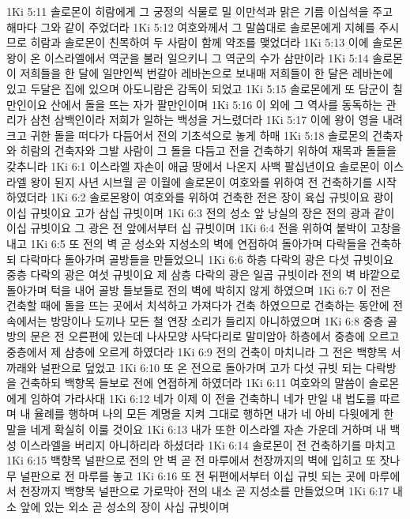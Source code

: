 1Ki 5:11  솔로몬이 히람에게 그 궁정의 식물로 밀 이만석과 맑은 기름 이십석을 주고 해마다 그와 같이 주었더라
1Ki 5:12  여호와께서 그 말씀대로 솔로몬에게 지혜를 주시므로 히람과 솔로몬이 친목하여 두 사람이 함께 약조를 맺었더라
1Ki 5:13  이에 솔로몬 왕이 온 이스라엘에서 역군을 불러 일으키니 그 역군의 수가 삼만이라
1Ki 5:14  솔로몬이 저희들을 한 달에 일만인씩 번갈아 레바논으로 보내매 저희들이 한 달은 레바논에 있고 두달은 집에 있으며 아도니람은 감독이 되었고
1Ki 5:15  솔로몬에게 또 담군이 칠만인이요 산에서 돌을 뜨는 자가 팔만인이며
1Ki 5:16  이 외에 그 역사를 동독하는 관리가 삼천 삼백인이라 저희가 일하는 백성을 거느렸더라
1Ki 5:17  이에 왕이 영을 내려 크고 귀한 돌을 떠다가 다듬어서 전의 기초석으로 놓게 하매
1Ki 5:18  솔로몬의 건축자와 히람의 건축자와 그발 사람이 그 돌을 다듬고 전을 건축하기 위하여 재목과 돌들을 갖추니라
1Ki 6:1  이스라엘 자손이 애굽 땅에서 나온지 사백 팔십년이요 솔로몬이 이스라엘 왕이 된지 사년 시브월 곧 이월에 솔로몬이 여호와를 위하여 전 건축하기를 시작하였더라
1Ki 6:2  솔로몬왕이 여호와를 위하여 건축한 전은 장이 육십 규빗이요 광이 이십 규빗이요 고가 삼십 규빗이며
1Ki 6:3  전의 성소 앞 낭실의 장은 전의 광과 같이 이십 규빗이요 그 광은 전 앞에서부터 십 규빗이며
1Ki 6:4  전을 위하여 붙박이 고창을 내고
1Ki 6:5  또 전의 벽 곧 성소와 지성소의 벽에 연접하여 돌아가며 다락들을 건축하되 다락마다 돌아가며 골방들을 만들었으니
1Ki 6:6  하층 다락의 광은 다섯 규빗이요 중층 다락의 광은 여섯 규빗이요 제 삼층 다락의 광은 일곱 규빗이라 전의 벽 바깥으로 돌아가며 턱을 내어 골방 들보들로 전의 벽에 박히지 않게 하였으며
1Ki 6:7  이 전은 건축할 때에 돌을 뜨는 곳에서 치석하고 가져다가 건축 하였으므로 건축하는 동안에 전 속에서는 방망이나 도끼나 모든 철 연장 소리가 들리지 아니하였으며
1Ki 6:8  중층 골방의 문은 전 오른편에 있는데 나사모양 사닥다리로 말미암아 하층에서 중층에 오르고 중층에서 제 삼층에 오르게 하였더라
1Ki 6:9  전의 건축이 마치니라 그 전은 백향목 서까래와 널판으로 덮었고
1Ki 6:10  또 온 전으로 돌아가며 고가 다섯 규빗 되는 다락방을 건축하되 백향목 들보로 전에 연접하게 하였더라
1Ki 6:11  여호와의 말씀이 솔로몬에게 임하여 가라사대
1Ki 6:12  네가 이제 이 전을 건축하니 네가 만일 내 법도를 따르며 내 율례를 행하며 나의 모든 계명을 지켜 그대로 행하면 내가 네 아비 다윗에게 한 말을 네게 확실히 이룰 것이요
1Ki 6:13  내가 또한 이스라엘 자손 가운데 거하며 내 백성 이스라엘을 버리지 아니하리라 하셨더라
1Ki 6:14  솔로몬이 전 건축하기를 마치고
1Ki 6:15  백향목 널판으로 전의 안 벽 곧 전 마루에서 천장까지의 벽에 입히고 또 잣나무 널판으로 전 마루를 놓고
1Ki 6:16  또 전 뒤편에서부터 이십 규빗 되는 곳에 마루에서 천장까지 백향목 널판으로 가로막아 전의 내소 곧 지성소를 만들었으며
1Ki 6:17  내소 앞에 있는 외소 곧 성소의 장이 사십 규빗이며
